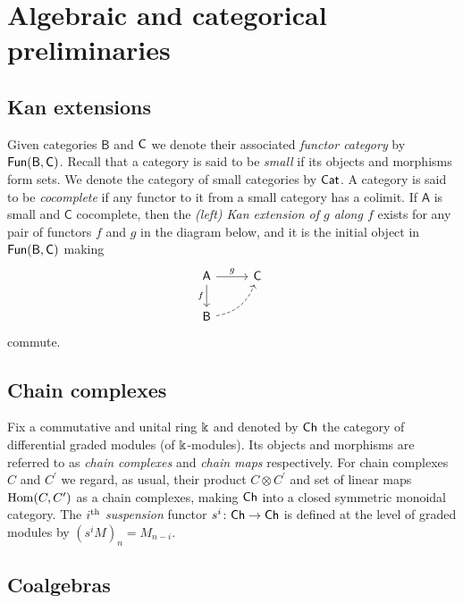 
\section{Algebraic and categorical preliminaries}

\subsection{Kan extensions}

Given categories $\mathsf{B}$ and $\mathsf{C}$ we denote their associated \textit{functor category} by $\mathsf{Fun}(\mathsf{B}, \mathsf{C})$.
Recall that a category is said to be \textit{small} if its objects and morphisms form sets.
We denote the category of small categories by $\mathsf{Cat}$.
A category is said to be \textit{cocomplete} if any functor to it from a small category has a colimit.
If $\mathsf{A}$ is small and $\mathsf{C}$ cocomplete, then the \textit{(left) Kan extension of $g$ along $f$} exists for any pair of functors $f$ and $g$ in the diagram below, and it is the initial object in $\mathsf{Fun}(\mathsf{B}, \mathsf{C})$ making
\begin{equation*}
\begin{tikzcd}[column sep=normal, row sep=normal]
\mathsf{A} \arrow[d, "f"'] \arrow[r, "g"] & \mathsf{C} \\ 
\mathsf{B} \arrow[dashed, ur, bend right] & \quad 
\end{tikzcd}
\end{equation*}
commute.

\subsection{Chain complexes}

Fix a commutative and unital ring $\Bbbk$ and denoted by $\mathsf{Ch}$ the category of differential graded modules (of $\Bbbk$-modules).
Its objects and morphisms are referred to as \textit{chain complexes} and \textit{chain maps} respectively.
For chain complexes $C$ and $C^\prime$ we regard, as usual, their product $C \otimes C^\prime$ and set of linear maps $\mathrm{Hom}(C, C^\prime)$ as a chain complexes, making $\mathsf{Ch}$ into a closed symmetric monoidal category.
The $i^\mathrm{th}$ \textit{suspension} functor $s^i \colon \mathsf{Ch} \to \mathsf{Ch}$ is defined at the level of graded modules by $(s^{i}M)_n = M_{n-i}$.

\subsection{Coalgebras}

